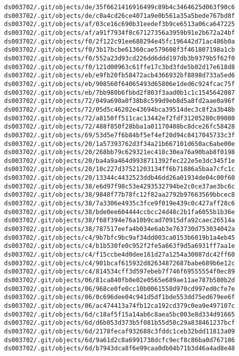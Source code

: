 \documentclass[11pt]{article}
\begin{document}
\begin{Verbatim}[commandchars=\\\{\}]
ds003702/.git/objects/de/35f6621416916499c89b4c3464625d063f90c6
ds003702/.git/objects/de/c0a4cd26ce4071a9e0b561a35a5bede767bd8f
ds003702/.git/objects/af/03ce16c690b31eedef3b9ce6513a06ca647225
ds003702/.git/objects/af/a91f7934f8c67127356a3959b91e2b672a24bf
ds003702/.git/objects/f0/2f122c91ee688294e45fc196442d71ac486b0a
ds003702/.git/objects/f0/3b17bcbe61360cae579608f3f461807198a1cb
ds003702/.git/objects/f0/552a23d93cd226dd6ddd197db3b9379b5f62f0
ds003702/.git/objects/f0/121d00963c61ffe17c3bd3fde5b02d17e618d8
ds003702/.git/objects/eb/e9fb20fb58472acb4366932bf8898d733a5ed6
ds003702/.git/objects/eb/908560f64065493d65806e1ded6c924fcac75f
ds003702/.git/objects/eb/7bb980b6fbbd2f803f3aad0b1c1c1545642087
ds003702/.git/objects/72/049a690a0f38b8c599d9eb8d5a8fd2aae0a96f
ds003702/.git/objects/72/05d5c46202e43694bca39514dec3c8f2a3b48b
ds003702/.git/objects/72/a8150ff511cac13442ef2fdf31205280c09080
ds003702/.git/objects/72/488f850f28bba1a01170408bc8dce26fc58428
ds003702/.git/objects/69/53d5e7f6b84bf5ef4ef20d94c8417045733c3f
ds003702/.git/objects/20/1a57393762d3f34a21b667101d650ac6abe00e
ds003702/.git/objects/20/268bb79c629321ec418c30ea76a90bab8f0198
ds003702/.git/objects/20/ba4a9a464d9938711392fec222e5e3dc345f1e
ds003702/.git/objects/20/10c227d37521203134ff6b71886a5baa7cfc1c
ds003702/.git/objects/20/13344c4432523ddb46dd26a01934de04c00f60
ds003702/.git/objects/38/e6d97f98c53e4293532794be2c0ce37ae3bc6c
ds003702/.git/objects/38/9848f77b78fc12f82aa2792b97663569bbcec8
ds003702/.git/objects/38/7a3306e4935c3fce9f019e439c0c427aff28c6
ds003702/.git/objects/38/bde0ee604444ccbcc24d48c2b1fa6055b1b36e
ds003702/.git/objects/38/f68f394e76a10b9cad70915dfa92caec26514a
ds003702/.git/objects/38/787517eefa4b034e6ab3e763730d753034042a
ds003702/.git/objects/c4/9b7bfc9bc9af34dd003ca0153b6019b1a4eb45
ds003702/.git/objects/c4/b1b530fe0c952f2fe5a663f9d5a6931ff7aa1e
ds003702/.git/objects/c4/f15ccbe4d0dee161d27a1254a30087dc42ff60
ds003702/.git/objects/c4/901bcaf615932d82634872687babe689b6e12c
ds003702/.git/objects/c4/814534cff3d597ebeb7f746f69555554f0ec89
ds003702/.git/objects/06/81ca840fb0e02e0565e689ae11ae787b580b2d
ds003702/.git/objects/06/968ce0fe0cc10b0061558d970cd997ed0cfe7e
ds003702/.git/objects/06/0c696dee04c941d5df1bde553dd75ed679ee6f
ds003702/.git/objects/06/ac474413a74fb12ca192cd379c0ea9e497107c
ds003702/.git/objects/6d/c18af5f15a14ab6c8aea5bc003e8d334d91665
ds003702/.git/objects/6d/d6b053d373b5f081b55d50c29a838461237bcf
ds003702/.git/objects/6d/2178fecaf932688c3fddc1ceb32bdd11813a09
ds003702/.git/objects/6d/9a61d2c8a6991738dcfc9ecf8c86ba0d767186
ds003702/.git/objects/6d/b7943dca8f6e99caa0db04b71b3d46a4ad8e48

\end{Verbatim}
\end{document}

